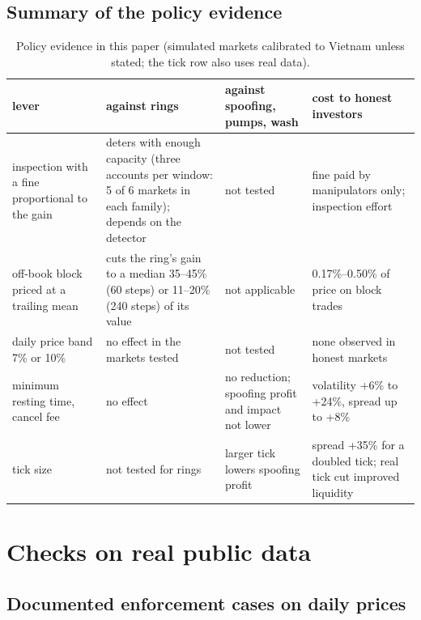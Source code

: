 \documentclass[11pt,a4paper]{article}
\begin{document}
\subsection{Summary of the policy evidence}

\begin{table}[t]
\centering\footnotesize
\begin{tabular}{p{3.1cm}p{4.2cm}p{3.6cm}p{3.6cm}}
\toprule
lever & against rings & against spoofing, pumps, wash & cost to honest investors\\
\midrule
inspection with a fine proportional to the gain & deters with enough capacity (three accounts per window: 5 of 6 markets in each family); depends on the detector & not tested & fine paid by manipulators only; inspection effort\\
off-book block priced at a trailing mean & cuts the ring's gain to a median 35--45\% (60 steps) or 11--20\% (240 steps) of its value & not applicable & 0.17\%--0.50\% of price on block trades\\
daily price band 7\% or 10\% & no effect in the markets tested & not tested & none observed in honest markets\\
minimum resting time, cancel fee & no effect & no reduction; spoofing profit and impact not lower & volatility +6\% to +24\%, spread up to +8\%\\
tick size & not tested for rings & larger tick lowers spoofing profit & spread +35\% for a doubled tick; real tick cut improved liquidity\\
\bottomrule
\end{tabular}
\caption{Policy evidence in this paper (simulated markets calibrated to Vietnam unless stated; the tick row also uses real data).}\label{tab:summary}
\end{table}

\section{Checks on real public data}\label{sec:real}

\subsection{Documented enforcement cases on daily prices}
\end{document}
